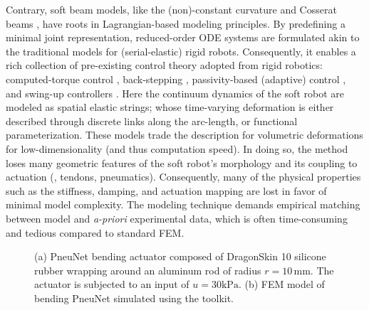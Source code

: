Contrary, soft beam models, like the (non)-constant curvature \cite{Katzschmann2019,DellaSantina2020,Caasenbrood2022} and Cosserat beams \cite{Boyer2021,Renda2020}, have roots in Lagrangian-based modeling principles. By predefining a minimal joint representation, reduced-order ODE systems are formulated akin to the traditional models for (serial-elastic) rigid robots. Consequently, it enables a rich collection of pre-existing control theory adopted from rigid robotics: computed-torque control \cite{Katzschmann2019}, back-stepping \cite{Stolzle2021}, passivity-based (adaptive) control \cite{Caasenbrood2022,Franco2020}, and swing-up controllers \cite{Weerakoon2021Dec}. Here the continuum dynamics of the soft robot are modeled as spatial elastic strings; whose time-varying deformation is either described through discrete links along the arc-length, or functional parameterization. These models trade the description for volumetric deformations for low-dimensionality (and thus computation speed). In doing so, the method loses many geometric features of the soft robot's morphology and its coupling to actuation (\eg, tendons, pneumatics). Consequently, many of the physical properties such as the stiffness, damping, and actuation mapping are lost in favor of minimal model complexity. The modeling technique demands empirical matching between model and \emph{a-priori} experimental data, which is often time-consuming and tedious compared to standard FEM.

\begin{figure}[!t]
  \ifx\printFigures\undefined
  \else
  \centering
  
  \vspace{1mm}
  \fi
  \caption{(a) PneuNet bending actuator composed of DragonSkin 10 silicone rubber wrapping around an aluminum rod of radius $r = 10 \,\si{\milli \meter}$. The actuator is subjected to an input of $u = 30 \si{\kilo \pascal}$. (b) FEM model of bending PneuNet simulated using the \sorotoki toolkit. }
  \label{fig:C4:pneunet}
  \vspace{-5mm}
\end{figure}

